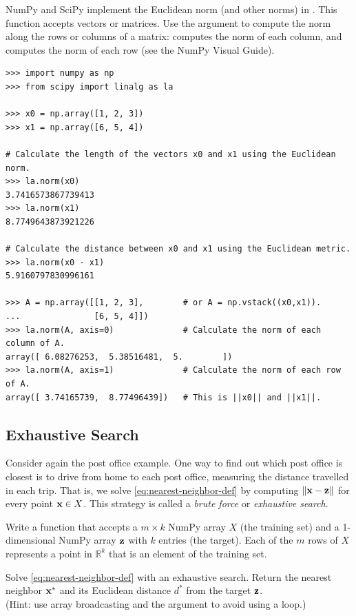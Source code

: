 NumPy and SciPy implement the Euclidean norm (and other norms) in .
This function accepts vectors or matrices.
Use the  argument to compute the norm along the rows or columns of a matrix:  computes the norm of each column, and  computes the norm of each row (see the NumPy Visual Guide).

\begin{lstlisting}
>>> import numpy as np
>>> from scipy import linalg as la

>>> x0 = np.array([1, 2, 3])
>>> x1 = np.array([6, 5, 4])

# Calculate the length of the vectors x0 and x1 using the Euclidean norm.
>>> la.norm(x0)
3.7416573867739413
>>> la.norm(x1)
8.7749643873921226

# Calculate the distance between x0 and x1 using the Euclidean metric.
>>> la.norm(x0 - x1)
5.9160797830996161

>>> A = np.array([[1, 2, 3],        # or A = np.vstack((x0,x1)).
...               [6, 5, 4]])
>>> la.norm(A, axis=0)              # Calculate the norm of each column of A.
array([ 6.08276253,  5.38516481,  5.        ])
>>> la.norm(A, axis=1)              # Calculate the norm of each row of A.
array([ 3.74165739,  8.77496439])   # This is ||x0|| and ||x1||.
\end{lstlisting}

\subsection*{Exhaustive Search} %

Consider again the post office example.
One way to find out which post office is closest is to drive from home to each post office, measuring the distance travelled in each trip.
That is, we solve \eqref{eq:nearest-neighbor-def} by computing $\|\mathbf{x} - \mathbf{z}\|$ for every point $\mathbf{x}\in X$.
This strategy is called a \emph{brute force} or \emph{exhaustive search}.

\begin{problem} %
Write a function that accepts a $m\times k$ NumPy array $X$ (the training set) and a 1-dimensional NumPy array $\mathbf{z}$ with $k$ entries (the target).
Each of the $m$ rows of $X$ represents a point in $\mathbb{R}^k$ that is an element of the training set.

Solve \eqref{eq:nearest-neighbor-def} with an exhaustive search.
Return the nearest neighbor $\mathbf{x}^*$ and its Euclidean distance $d^*$ from the target $\mathbf{z}$.
\\(Hint: use array broadcasting and the  argument to avoid using a loop.)
\label{prob:nearest-neighbor-exhaustive-search}
\end{problem}

